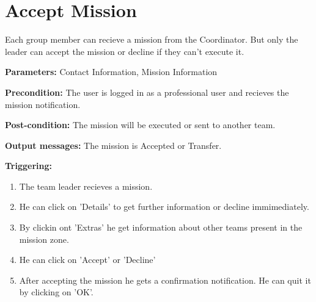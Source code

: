 \section{Accept Mission}
\label{operation:AcceptMission}
Each group member can recieve a mission from the Coordinator. But only the
leader can accept the mission or decline if they can't execute it.\\
\begin{description}
\item \textbf{Parameters:} Contact Information, Mission Information
\item \textbf{Precondition:} The user is logged in as a professional user
and recieves the mission notification.
\item \textbf{Post-condition:} The mission will be executed or sent to another
team.
\item \textbf{Output messages:} The mission is Accepted or Transfer.
\item \textbf{Triggering:}
\begin{enumerate}
\item The team leader recieves a mission.
\item He can click on 'Details' to get further information or decline
immimediately.
\item By clickin ont 'Extras' he get information about other teams present in
the mission zone.
\item He can click on 'Accept' or 'Decline'
\item After accepting the mission he gets a confirmation notification. He can
quit it by clicking on 'OK'.
\end{enumerate}
\end{description} 

